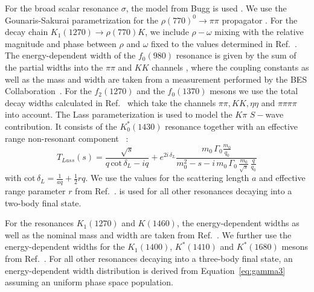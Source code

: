  For the broad scalar resonance $\sigma$,
     		the model from Bugg is used \cite{BuggSigma}.
	We use the Gounaris-Sakurai parametrization for the $\rho(770)^{0} \to \pi \pi$ propagator \cite{GS}.
	For the decay chain $K_1(1270) \to \rho(770) K$, we include $\rho-\omega$ mixing with the relative magnitude and phase between $\rho$ and $\omega$ fixed 
	to the values determined in Ref.~\cite{Schubiger}.
	The energy-dependent width of the $f_{0}(980)$ resonance is given by the sum of the partial widths into the $\pi\pi$ and $KK$ channels \cite{Flatte},
		where the coupling constants %
		as well as the mass and width are taken from a measurement performed by the BES Collaboration~\cite{Flatte2}.
	     	For the $f_{2}(1270)$ and the $f_{0}(1370)$ mesons we use the total decay widths
		calculated in Ref.~\cite{dArgent:2017gzv} which take the channels $\pi  \pi, K  K, \eta  \eta$ and $\pi \pi \pi \pi$ into account. 	
	The {Lass} parameterization is used to model the $K\pi$ $S-$wave contribution.
	It consists of the $K_0^*(1430)$ resonance together with an effective range non-resonant component ~\cite{Lass,Aston:1987ir,Aubert:2005ce}:
	\begin{equation}
			T_{Lass}(s) = 
			\frac{\sqrt s}{q \, \text{cot}\, \delta_L- i q}   
			+ e^{2i \, \delta_L} \frac{m_0 \, \Gamma_0 \frac{m_0}{q_0}}{m_0^{2} - s - i\,m_{0}\,\Gamma_{0} \, \frac{m_{0}}{\sqrt s} \, \frac{q}{q_{0}}} 
	\label{eq:Lass}
	\end{equation}
	with $\text{cot}\, \delta_L = \frac{1}{aq} + \frac{1}{2} rq$.
	We use the values for the scattering length $a$ and effective range parameter $r$ from Ref.~\cite{Lass,Aston:1987ir}.
		 is used for all other resonances decaying into a two-body final state.

		For the resonances $K_1(1270)$ and $K(1460)$, the energy-dependent widths as well as the nominal mass and width are taken from Ref.~\cite{Aaij:2017kbo}.
		We further use the energy-dependent widths for the $K_1(1400)$, $K^*(1410)$ and $K^*(1680)$ mesons from Ref.~\cite{dArgent:2017gzv}. 	
		For all other resonances decaying into a three-body final state, an energy-dependent width distribution is derived from Equation~\ref{eq:gamma3} assuming an uniform phase space population. 

